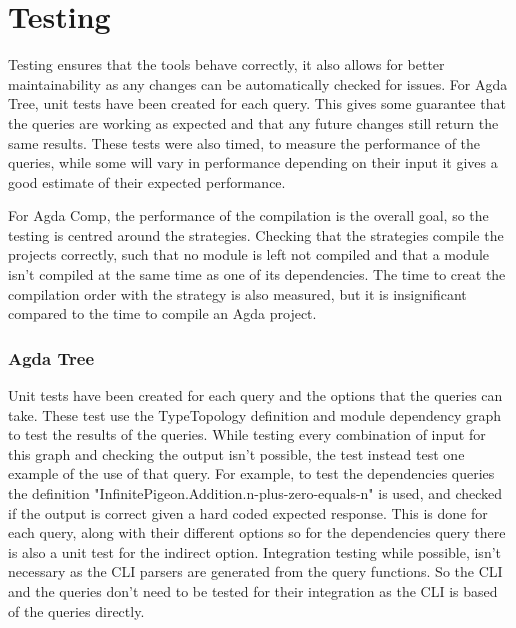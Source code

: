 
\chapter{Testing}

Testing ensures that the tools behave correctly, it also allows for better
maintainability as any changes can be automatically checked for issues. For
Agda Tree, unit tests have been created for each query. This gives some
guarantee that the queries are working as expected and that any future changes
still return the same results. These tests were also timed, to measure the
performance of the queries, while some will vary in performance depending on
their input it gives a good estimate of their expected performance.

For Agda Comp, the performance of the compilation is the overall goal, so the
testing is centred around the strategies. Checking that the strategies compile
the projects correctly, such that no module is left not compiled and that a
module isn't compiled at the same time as one of its dependencies. The time to
creat the compilation order with the strategy is also measured, but it is
insignificant compared to the time to compile an Agda project.

\subsection{Agda Tree}

Unit tests have been created for each query and the options that the queries
can take. These test use the TypeTopology definition and module dependency
graph to test the results of the queries. While testing every combination of
input for this graph and checking the output isn't possible, the test instead
test one example of the use of that query. For example, to test the
dependencies queries the definition
"InfinitePigeon.Addition.n-plus-zero-equals-n" is used, and checked if the
output is correct given a hard coded expected response. This is done for each
query, along with their different options so for the dependencies query there
is also a unit test for the indirect option. Integration testing while
possible, isn't necessary as the CLI parsers are generated from the query
functions. So the CLI and the queries don't need to be tested for their
integration as the CLI is based of the queries directly. 


